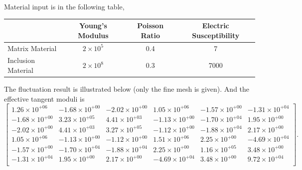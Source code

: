 \documentclass[10pt,a4paper]{scrreprt}
\begin{document}
Material input is in the following table,
\begin{center}
\begin{tabular}{l|c|c|c}
\hline
& Young's Modulus & Poisson Ratio & Electric Susceptibility\\
\hline
Matrix Material & $2\times 10^{5}$ & 0.4 & 7 \\
Inclusion Material & $2\times 10^{8}$ & 0.3 & 7000 \\
\hline
\end{tabular}
\end{center}

The fluctuation result is illustrated below (only the fine mesh is given). And the effective tangent moduli is
\[
\begin{bmatrix}
1.26 \times 10^{+06} & -1.68 \times 10^{+00} & -2.02 \times 10^{+00} & 1.05 \times 10^{+06} & -1.57 \times 10^{+00} & -1.31 \times 10^{+04}\\ 
-1.68 \times 10^{+00} & 3.23 \times 10^{+05} & 4.41 \times 10^{+03} & -1.13 \times 10^{+00} & -1.70 \times 10^{+04} & 1.95 \times 10^{+00}\\ 
-2.02 \times 10^{+00} & 4.41 \times 10^{+03} & 3.27 \times 10^{+05} & -1.12 \times 10^{+00} & -1.88 \times 10^{+04} & 2.17 \times 10^{+00}\\ 
1.05 \times 10^{+06} & -1.13 \times 10^{+00} & -1.12 \times 10^{+00} & 1.51 \times 10^{+06} & 2.25 \times 10^{+00} & -4.69 \times 10^{+04}\\ 
-1.57 \times 10^{+00} & -1.70 \times 10^{+04} & -1.88 \times 10^{+04} & 2.25 \times 10^{+00} & 1.16 \times 10^{+05} & 3.48 \times 10^{+00}\\ 
-1.31 \times 10^{+04} & 1.95 \times 10^{+00} & 2.17 \times 10^{+00} & -4.69 \times 10^{+04} & 3.48 \times 10^{+00} & 9.72 \times 10^{+04}\\  
\end{bmatrix}.
\]
\end{document}
